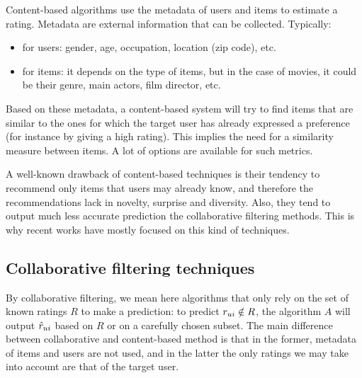 Content-based algorithms use the metadata of users and items to estimate a
rating. Metadata are external information that can be collected. Typically:

\begin{itemize}
\item for users: gender, age, occupation, location (zip code), etc.
\item for items: it depends on the type of items, but in the case of movies, it
  could be their genre, main actors, film director, etc.
\end{itemize}

Based on these metadata, a content-based system will try to find items that are
similar to the ones for which the target user has already expressed a
preference (for instance by giving a high rating). This implies the need for a
similarity measure between items. A lot of options are available for such
metrics.

A well-known drawback of content-based techniques is their tendency to
recommend only items that users may already know, and therefore the
recommendations lack in novelty, surprise and diversity. Also, they tend to
output much less accurate prediction the collaborative filtering methods. This
is why recent works have mostly focused on this kind of techniques.

\subsection{Collaborative filtering techniques}
\label{sec:collaborative_filtering}
By collaborative filtering, we mean here algorithms that only rely on the set
of known ratings $R$ to make a prediction: to predict $r_{ui} \notin R$, the
algorithm $A$ will output $\hat{r}_{ui}$ based on $R$ or on a carefully chosen
subset.  The main difference between collaborative and content-based method is
that in the former, metadata of items and users are not used, and in the latter
the only ratings we may take into account are that of the target user.

